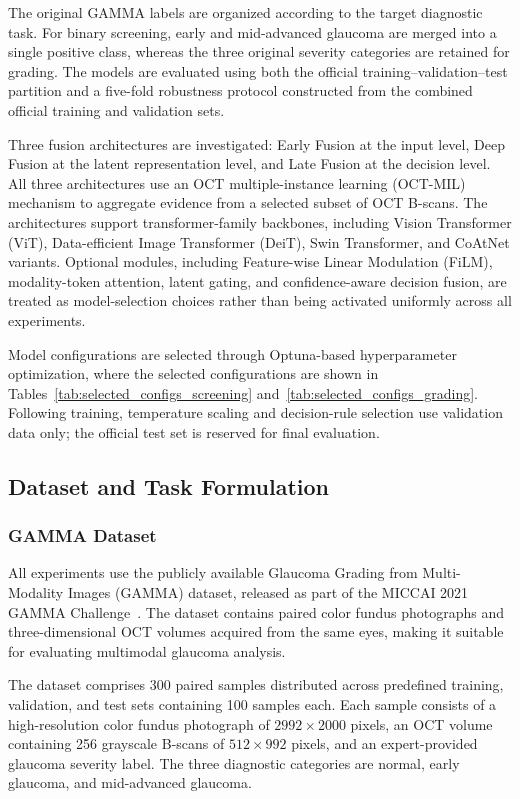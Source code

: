 \documentclass{ieeeaccess}
\begin{document}
The original GAMMA labels are organized according to the target diagnostic task. For binary screening, early and mid-advanced glaucoma are merged into a single positive class, whereas the three original severity categories are retained for grading. The models are evaluated using both the official training--validation--test partition and a five-fold robustness protocol constructed from the combined official training and validation sets.

Three fusion architectures are investigated: Early Fusion at the input level, Deep Fusion at the latent representation level, and Late Fusion at the decision level. All three architectures use an OCT multiple-instance learning (OCT-MIL) mechanism to aggregate evidence from a selected subset of OCT B-scans. The architectures support transformer-family backbones, including Vision Transformer (ViT), Data-efficient Image Transformer (DeiT), Swin Transformer, and CoAtNet variants. Optional modules, including Feature-wise Linear Modulation (FiLM), modality-token attention, latent gating, and confidence-aware decision fusion, are treated as model-selection choices rather than being activated uniformly across all experiments.

Model configurations are selected through Optuna-based hyperparameter optimization, where the selected configurations are shown in Tables~\ref{tab:selected_configs_screening} and~\ref{tab:selected_configs_grading}. Following training, temperature scaling and decision-rule selection use validation data only; the official test set is reserved for final evaluation.

\subsection{Dataset and Task Formulation}
\label{subsec:dataset_tasks}

\subsubsection{GAMMA Dataset}
\label{subsubsec:gamma_dataset}

All experiments use the publicly available Glaucoma Grading from Multi-Modality Images (GAMMA) dataset, released as part of the MICCAI 2021 GAMMA Challenge~\cite{wu2023gamma}. The dataset contains paired color fundus photographs and three-dimensional OCT volumes acquired from the same eyes, making it suitable for evaluating multimodal glaucoma analysis.

The dataset comprises 300 paired samples distributed across predefined training, validation, and test sets containing 100 samples each. Each sample consists of a high-resolution color fundus photograph of $2992\times2000$ pixels, an OCT volume containing 256 grayscale B-scans of $512\times992$ pixels, and an expert-provided glaucoma severity label. The three diagnostic categories are normal, early glaucoma, and mid-advanced glaucoma.
\end{document}
